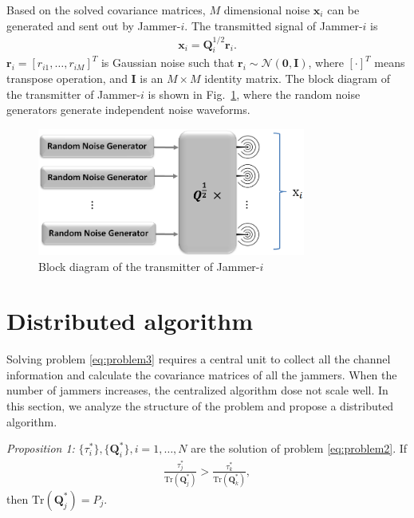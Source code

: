 \documentclass[conference]{IEEEtran}
\begin{document}
Based on the solved covariance matrices,  $M$ dimensional noise $\mathbf{x}_i$ can be generated and sent out by Jammer-$i$. The transmitted signal of Jammer-$i$ is 
\begin{eqnarray}
\mathbf{x}_i = \mathbf{Q}_i^{1/2}\mathbf{r}_i.
\end{eqnarray} 
$\mathbf{r}_i = [r_{i1},\ldots,r_{iM}]^T$ is Gaussian noise such that $\mathbf{r}_i \sim \mathcal{N}(\mathbf{0},\mathbf{I})$, where $[\cdot]^T$ means transpose operation, and $\mathbf{I}$ is an $M \times M$ identity matrix. 
The block diagram of the transmitter of Jammer-$i$ is shown in Fig.~\ref{fig:transmitter}, where the random noise generators generate independent noise waveforms.
\begin{figure}[h]
	\centering
	\includegraphics[width=8.8cm]{transmitter.png} %
	\caption{Block diagram of the transmitter of Jammer-$i$}
	\label{fig:transmitter}
\end{figure}

\section{Distributed algorithm} \label{sec:distributed algorithm}
Solving problem \eqref{eq:problem3} requires a central unit to collect all the channel information and calculate the covariance matrices of all the jammers. When the number of jammers increases, the centralized algorithm dose not scale well. In this section, we analyze the structure of the problem and propose a distributed algorithm. 

\emph{Proposition 1:} $\{\tau_i^*\}, \{\mathbf{Q}_i^*\}, i = 1, \ldots, N$ are the solution of problem \eqref{eq:problem2}. If 
\begin{eqnarray}
\frac{\tau_j^*}{\mathrm{Tr}(\mathbf{Q}_j^*)} > \frac{\tau_k^*}{\mathrm{Tr}(\mathbf{Q}_k^*)} \label{eq:efficiency},
\end{eqnarray}
then $\mathrm{Tr}(\mathbf{Q}_j^*) = P_j$.
\end{document}
